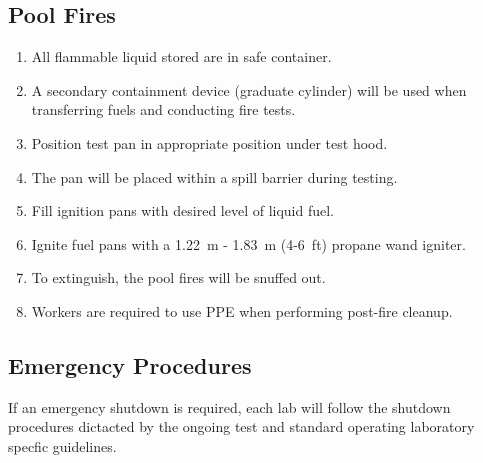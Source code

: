 \documentclass[12pt,oneside]{book}
\begin{document}
\subsection{Pool Fires}
\label{proc_poolfire}
\begin{enumerate}
  \item All flammable liquid stored are in safe container. 
  \item A secondary containment device (graduate cylinder) will be used when transferring fuels and conducting fire tests.
  \item Position test pan in appropriate position under test hood.
  \item The pan will be placed within a spill barrier during testing.
  \item Fill ignition pans with desired level of liquid fuel.
  \item Ignite fuel pans with a 1.22~m - 1.83~m (4-6~ft) propane wand igniter.
  \item To extinguish, the pool fires will be snuffed out.
  \item Workers are required to use PPE when performing post-fire cleanup.
\end{enumerate}

\subsection{Emergency Procedures}
If an emergency shutdown is required, each lab will follow the shutdown procedures dictacted by the ongoing test and standard operating laboratory specfic guidelines.
\end{document}
